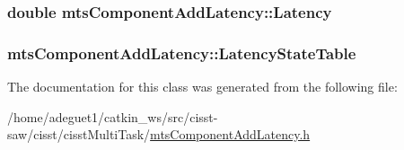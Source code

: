 \hypertarget{classmts_component_add_latency_a39ff64ef2a5151a991f7173613136747}{
\subsubsection[{Latency}]{\setlength{\rightskip}{0pt plus 5cm}double mts\-Component\-Add\-Latency\-::\-Latency\hspace{0.3cm}{\ttfamily [protected]}}}\label{classmts_component_add_latency_a39ff64ef2a5151a991f7173613136747}
\hypertarget{classmts_component_add_latency_a41d4fcc2b22bd8bb53b2a99159f7b667}{
\subsubsection[{Latency\-State\-Table}]{ mts\-Component\-Add\-Latency\-::\-Latency\-State\-Table\hspace{0.3cm}{\ttfamily [protected]}}}\label{classmts_component_add_latency_a41d4fcc2b22bd8bb53b2a99159f7b667}


The documentation for this class was generated from the following file\-:\begin{DoxyCompactItemize}
\item 
/home/adeguet1/catkin\-\_\-ws/src/cisst-\/saw/cisst/cisst\-Multi\-Task/\hyperlink{mts_component_add_latency_8h}{mts\-Component\-Add\-Latency.\-h}\end{DoxyCompactItemize}
